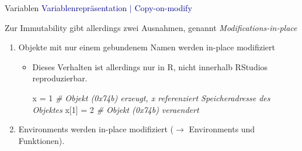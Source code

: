 \documentclass[
  8pt,
  ignorenonframetext,
]{beamer}
\newenvironment{Shaded}{\begin{snugshade}}{\end{snugshade}}
\newcommand{\CommentTok}[1]{\textcolor[rgb]{0.56,0.35,0.01}{\textit{#1}}}
\newcommand{\DecValTok}[1]{\textcolor[rgb]{0.00,0.00,0.81}{#1}}
\newcommand{\NormalTok}[1]{#1}
\newcommand{\OtherTok}[1]{\textcolor[rgb]{0.56,0.35,0.01}{#1}}
\providecommand{\tightlist}{%
  \setlength{\itemsep}{0pt}\setlength{\parskip}{0pt}}
\begin{document}
\begin{frame}[fragile]{Variablen}
\protect\hypertarget{variablen-8}{}
\textcolor{darkblue}{Variablenrepräsentation $\vert$ Copy-on-modify}
\vspace{2mm} \small {}

Zur Immutability gibt allerdings zwei Ausnahmen, genannt
\textit{Modifications-in-place}

\begin{enumerate}
\item
  Objekte mit nur einem gebundenem Namen werden in-place modifiziert

  \begin{itemize}
  \item
    \footnotesize Dieses Verhalten ist allerdings nur in R, nicht
    innerhalb RStudios reproduzierbar.

\begin{Shaded}
\begin{Highlighting}[]
\NormalTok{x }\OtherTok{=} \DecValTok{1}         \CommentTok{\# Objekt (0x74b) erzeugt, x referenziert Speicheradresse des Objektes}
\NormalTok{x[}\DecValTok{1}\NormalTok{] }\OtherTok{=} \DecValTok{2}  \CommentTok{\# Objekt (0x74b) veraendert}
\end{Highlighting}
\end{Shaded}
  \end{itemize}
\end{enumerate}

\small

\begin{enumerate}
\setcounter{enumi}{1}
\tightlist
\item
  Environments werden in-place modifiziert (\(\rightarrow\) Environments
  und Funktionen).
\end{enumerate}
\end{frame}
\end{document}
